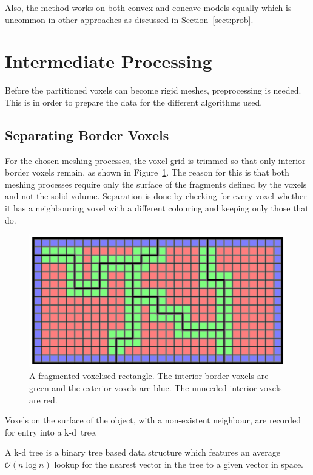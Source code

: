 Also, the method works on both convex and concave models equally which is uncommon in other approaches as discussed in Section~\ref{sect:prob}.

\section{Intermediate Processing}

Before the partitioned voxels can become rigid meshes, preprocessing is needed. This is in order to prepare the data for the different algorithms used.

\subsection{Separating Border Voxels}

For the chosen meshing processes, the voxel grid is trimmed so that only interior border voxels remain, as shown in Figure~\ref{fig:3.7}. The reason for this is that both meshing processes require only the surface of the fragments defined by the voxels and not the solid volume. Separation is done by checking for every voxel whether it has a neighbouring voxel with a different colouring and keeping only those that do.

\begin{figure}[b!]
\centerline{\includegraphics[scale=0.9]{border213.pdf}}
\caption{A fragmented voxelised rectangle. The interior border voxels are green and the exterior voxels are blue. The unneeded interior voxels are red.}
\label{fig:3.7}
\end{figure}

Voxels on the surface of the object, with a non-existent neighbour, are recorded for entry into a k-d~tree.

A k-d tree is a binary tree based data structure which features an average $\mathcal{O}(n\log{}n)$ lookup for the nearest vector in the tree to a given vector in space.

